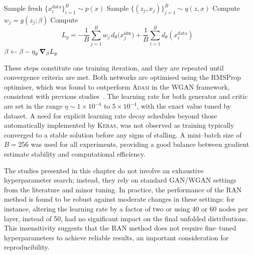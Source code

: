 {{\begin{algorithm}\ContinuedFloat
    \caption[]{(continued)}
    \begin{algorithmic}
    \algospacing
      \State {}
        \State Sample fresh $\{x_i^{\text{data}}\}_{i=1}^B\sim p(x)$
        \State Sample $\{(z_j, x_j)\}_{j=1}^B\sim q(z, x)$
        \State Compute $w_j = g(z_j;\beta)$
        \State Compute
        \[
          L_g 
          = -\frac1B\sum_{j=1}^B w_j\,d_{\theta}\bigl(x_j^{\text{sim}}\bigr)
            + \frac1B\sum_{i=1}^B d_{\theta}(x_i^{\text{data}})
        \]
        \State $\beta \leftarrow\beta - \eta_g\,\grad_{\beta}L_g$
      \EndFor
    \EndFor
    \end{algorithmic}
\end{algorithm}
        
        These steps constitute one training iteration, and they are repeated until convergence criteria are met.
        Both networks are optimised using the RMSProp optimiser, which was found to outperform \textsc{Adam} in the WGAN framework, consistent with previous studies~\cite{henderson_where_2018}.
        The learning rate for both generator and critic are set in the range $\eta \sim 1\times10^{-4}$ to $5\times10^{-4}$, with the exact value tuned by dataset.
        A need for explicit learning rate decay schedules beyond those automatically implemented by \textsc{Keras}, was not observed as training typically converged to a stable solution before any signs of stalling.
        A mini--batch size of $B=256$ was used for all experiments, providing a good balance between gradient estimate stability and computational efficiency.
        
        The studies presented in this chapter do not involve an exhaustive hyperparameter search; instead, they rely on standard GAN/WGAN settings from the literature and minor tuning.
        In practice, the performance of the RAN method is found to be robust against moderate changes in these settings: for instance, altering the learning rate by a factor of two or using 40 or 60 nodes per layer, instead of 50, had no significant impact on the final unfolded distributions.
        This insensitivity suggests that the RAN method does not require fine--tuned hyperparameters to achieve reliable results, an important consideration for reproducibility.
    
}}
